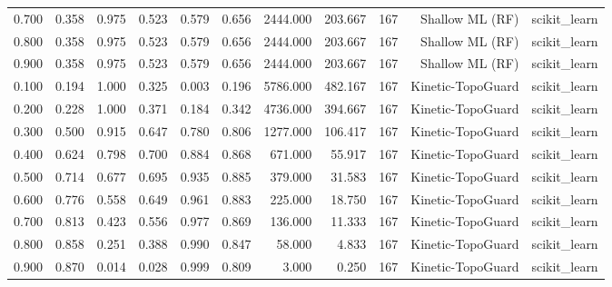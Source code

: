 \begin{tabular}{lrrrrrrrrrr}
0.700 & 0.358 & 0.975 & 0.523 & 0.579 & 0.656 & 2444.000 & 203.667 & 167 & Shallow ML (RF) & scikit\_learn \\
0.800 & 0.358 & 0.975 & 0.523 & 0.579 & 0.656 & 2444.000 & 203.667 & 167 & Shallow ML (RF) & scikit\_learn \\
0.900 & 0.358 & 0.975 & 0.523 & 0.579 & 0.656 & 2444.000 & 203.667 & 167 & Shallow ML (RF) & scikit\_learn \\
0.100 & 0.194 & 1.000 & 0.325 & 0.003 & 0.196 & 5786.000 & 482.167 & 167 & Kinetic-TopoGuard & scikit\_learn \\
0.200 & 0.228 & 1.000 & 0.371 & 0.184 & 0.342 & 4736.000 & 394.667 & 167 & Kinetic-TopoGuard & scikit\_learn \\
0.300 & 0.500 & 0.915 & 0.647 & 0.780 & 0.806 & 1277.000 & 106.417 & 167 & Kinetic-TopoGuard & scikit\_learn \\
0.400 & 0.624 & 0.798 & 0.700 & 0.884 & 0.868 & 671.000 & 55.917 & 167 & Kinetic-TopoGuard & scikit\_learn \\
0.500 & 0.714 & 0.677 & 0.695 & 0.935 & 0.885 & 379.000 & 31.583 & 167 & Kinetic-TopoGuard & scikit\_learn \\
0.600 & 0.776 & 0.558 & 0.649 & 0.961 & 0.883 & 225.000 & 18.750 & 167 & Kinetic-TopoGuard & scikit\_learn \\
0.700 & 0.813 & 0.423 & 0.556 & 0.977 & 0.869 & 136.000 & 11.333 & 167 & Kinetic-TopoGuard & scikit\_learn \\
0.800 & 0.858 & 0.251 & 0.388 & 0.990 & 0.847 & 58.000 & 4.833 & 167 & Kinetic-TopoGuard & scikit\_learn \\
0.900 & 0.870 & 0.014 & 0.028 & 0.999 & 0.809 & 3.000 & 0.250 & 167 & Kinetic-TopoGuard & scikit\_learn \\
\bottomrule
\end{tabular}